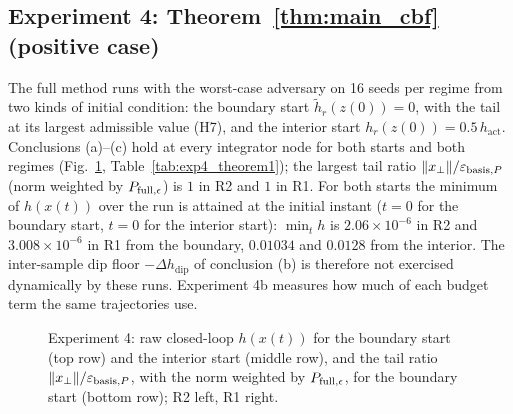 \subsection{Experiment 4: Theorem~\ref{thm:main_cbf} (positive case)}
The full method runs with the worst-case adversary on 16 seeds per regime from two kinds of initial
condition: the boundary start \(\tilde h_r(z(0)) = 0\), with the tail at its largest admissible value (H7), and the
interior start \(h_r(z(0)) = 0.5\,h_{\mathrm{act}}\). Conclusions (a)--(c) hold at every integrator
node for both starts and both regimes (Fig.~\ref{fig:exp4}, Table~\ref{tab:exp4_theorem1}); the largest tail ratio
\(\|x_\perp\|/\varepsilon_{\mathrm{basis},P}\) (norm weighted by \(P_{\mathrm{full},\epsilon}\)) is \(1\) in R2 and \(1\) in R1.
For both starts the minimum of \(h(x(t))\) over the run is attained at the initial instant
(\(t = 0\) for the boundary start, \(t = 0\) for the interior start): \(\min_t h\) is
\(2.06\times10^{-6}\) in R2 and \(3.008\times10^{-6}\) in R1 from the boundary, \(0.01034\) and \(0.0128\) from
the interior. The inter-sample dip floor \(-\Delta h_{\mathrm{dip}}\) of conclusion (b) is therefore not exercised
dynamically by these runs. Experiment 4b measures how much of each budget term the same trajectories use.

\begin{figure}[t]\centering{}
\caption{Experiment 4: raw closed-loop \(h(x(t))\) for the boundary start (top row) and the interior start (middle row),
and the tail ratio \(\|x_\perp\|/\varepsilon_{\mathrm{basis},P}\), with the norm weighted by \(P_{\mathrm{full},\epsilon}\), for the boundary start (bottom row); R2 left, R1 right.}\label{fig:exp4}\end{figure}


